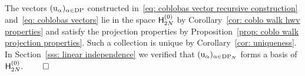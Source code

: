 \documentclass[oneside,english]{amsart}
\numberwithin{equation}{section}
\numberwithin{figure}{section}
\theoremstyle{plain}
\theoremstyle{plain}
\theoremstyle{plain}
\theoremstyle{remark}
\theoremstyle{plain}
\theoremstyle{plain}
\theoremstyle{plain}
\theoremstyle{plain}
\theoremstyle{plain}
\theoremstyle{plain}
\theoremstyle{plain}
\theoremstyle{plain}
\newcommand{\red}[1]{{\color{red} #1}}
\begin{document}
The vectors $(\mathrm{u}_\alpha)_{\alpha \in \mathrm{DP}}$ constructed
in~\eqref{eq: coblobas vector recursive construction} and~\eqref{eq: coblobas vectors}
lie in the space $\mathsf{H}_{2N}^{(0)}$ by Corollary~\ref{cor: coblo walk hwv properties}
and satisfy the projection properties by Proposition~\ref{prop: coblo walk projection properties}.
Such a collection is unique by Corollary~\ref{cor: uniqueness}.
In Section~\ref{sss: linear independence} we verified that
$(\mathrm{u}_\alpha)_{\alpha \in \mathrm{DP}_N}$ forms a basis of $\mathsf{H}_{2N}^{(0)}$.
$\hfill \qed$





%
\end{document}
